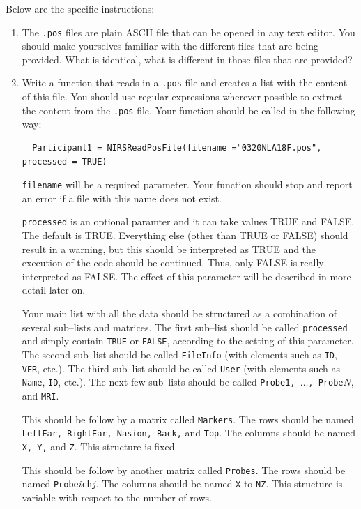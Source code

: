 \documentclass[11pt]{article}
\begin{document}
Below are the specific instructions:
\begin{enumerate}
\item The {\tt .pos} files are plain ASCII file that can be opened in any text editor.
You should make yourselves familiar with the different files that are being provided.
What is identical, what is different in those files that are provided?

\item Write a function that reads in a {\tt .pos} file and creates a list  with the
content of this file. You should use regular expressions wherever possible
to extract the content from the {\tt .pos} file.
Your function should be called in the following way:
\begin{verbatim}
  Participant1 = NIRSReadPosFile(filename ="0320NLA18F.pos", processed = TRUE)
\end{verbatim}
{\tt filename} will be a required parameter. Your function should stop and report
an error if a file with this name does not exist.

{\tt processed} is an optional paramter and it can take values TRUE and FALSE. The default
is TRUE. Everything else (other than TRUE or FALSE) 
should result in a warning, but  this should be interpreted as TRUE
and the execution of the code should be continued. Thus, only FALSE is really interpreted as FALSE.
The effect of this parameter will be described in more detail later on.

Your main list with all the data should be structured as a combination of several sub--lists and matrices.
The first sub--list should be called {\tt processed} and simply contain {\tt TRUE} or {\tt FALSE},
according to the setting of this parameter.
 The second sub--list should be called {\tt FileInfo} (with elements such as
{\tt ID}, {\tt VER}, etc.). 
The third sub--list should be called {\tt User} (with elements such as 
{\tt Name}, {\tt ID}, etc.). 
The next few sub--lists should be called {\tt Probe1, $\ldots$, Probe$N$}, and {\tt MRI}. 

This should be follow by a matrix called {\tt Markers}.
The rows should be named {\tt LeftEar, RightEar, Nasion, Back,} and {\tt Top}.
The columns should be named {\tt X, Y,} and {\tt Z}.
This structure is fixed.

This should be follow by another matrix called {\tt Probes}.
The rows should be named {\tt Probe$i$ch$j$}.
The columns should be named {\tt X} to {\tt NZ}.
This structure is variable with respect to the number of rows.


\end{enumerate}
\end{document}
